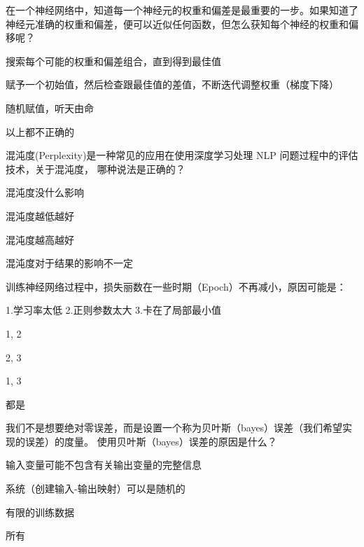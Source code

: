 \documentclass{exam-zh}
\begin{document}
\begin{question}
	在一个神经网络中，知道每一个神经元的权重和偏差是最重要的一步。如果知道了神经元准确的权重和偏差，便可以近似任何函数，但怎么获知每个神经的权重和偏移呢？\paren[B]
	\begin{choices}
		\item 搜索每个可能的权重和偏差组合，直到得到最佳值
		\item 赋予一个初始值，然后检查跟最佳值的差值，不断迭代调整权重（梯度下降）
		\item 随机赋值，听天由命
		\item 以上都不正确的
	\end{choices}
\end{question}

\begin{question}
	混沌度(Perplexity)是一种常见的应用在使用深度学习处理 NLP 问题过程中的评估技术，关于混沌度， 哪种说法是正确的？\paren[B]
	\begin{choices}
		\item 混沌度没什么影响
		\item 混沌度越低越好
		\item 混沌度越高越好
		\item 混沌度对于结果的影响不一定
	\end{choices}
\end{question}

\begin{question}
	训练神经网络过程中，损失丽数在一些时期（Epoch）不再减小，原因可能是：

	1.学习率太低 2.正则参数太大 3.卡在了局部最小值\paren[D]
	\begin{choices}
		\item 1, 2
		\item 2, 3
		\item 1, 3
		\item 都是
	\end{choices}
\end{question}

\begin{question}
	我们不是想要绝对零误差，而是设置一个称为贝叶斯（bayes）误差（我们希望实现的误差）的度量。 使用贝叶斯（bayes）误差的原因是什么？\paren[D]
	\begin{choices}
		\item 输入变量可能不包含有关输出变量的完整信息
		\item 系统（创建输入-输出映射）可以是随机的
		\item 有限的训练数据
		\item 所有
	\end{choices}
\end{question}
\end{document}
